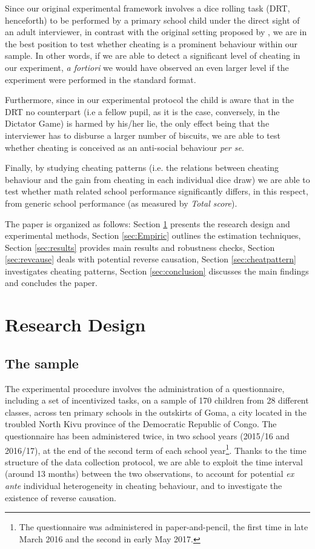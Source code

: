 \documentclass[authoryear, preprint, review, 12pt]{elsarticle}
\begin{document}
Since our original experimental framework involves a dice rolling task (DRT, henceforth) to be performed by a primary school child under the direct sight of an adult interviewer, in contrast with the original setting proposed by \cite{ff13}, we are in the best position to test whether cheating is a prominent behaviour within our sample. In other words, if we are able to detect a significant level of cheating in our experiment, \textit{a fortiori} we would have observed an even larger level if the experiment were performed in the standard format.  

Furthermore, since in our experimental protocol the child is aware that in the DRT no counterpart (i.e a fellow pupil, as it is the case, conversely, in the Dictator Game) is harmed by his/her lie, the only effect being that the interviewer has to disburse a larger number of biscuits, we are able to test whether cheating is conceived as an anti-social behaviour \textit{per se}.

Finally, by studying cheating patterns (i.e. the relations between cheating behaviour and the gain from cheating in each individual dice draw) we are able to test whether math related school performance significantly differs, in this respect, from generic school performance (as measured by \textit{Total score}).

The paper is organized as follows: Section \ref{sec:ResDes} presents the research design and experimental methods, Section \ref{sec:Empiric} outlines the estimation techniques, Section \ref{sec:results} provides main results and robustness checks, Section \ref{sec:revcause} deals with potential reverse causation, Section \ref{sec:cheatpattern} investigates cheating patterns, Section \ref{sec:conclusion} discusses the main findings and concludes the paper.

\section{Research Design}
\label{sec:ResDes}

\subsection{The sample}
\label{subsec:sample}
The experimental procedure involves the administration of a questionnaire, including a set of incentivized tasks, on a sample of 170 children from 28 different classes, across ten primary schools in the outskirts of Goma, a city located in the troubled North Kivu province of the Democratic Republic of Congo. The questionnaire has been administered twice, in two school years (2015/16 and 2016/17), at the end of the second term of each school year\footnote{The questionnaire was administered in paper-and-pencil, the first time in late March 2016 and the second in early May 2017.}. Thanks to the time structure of the data collection protocol, we are able to exploit the time interval (around 13 months) between the two observations, to account for potential \textit{ex ante} individual heterogeneity in cheating behaviour, and to investigate the existence of reverse causation.
\end{document}
